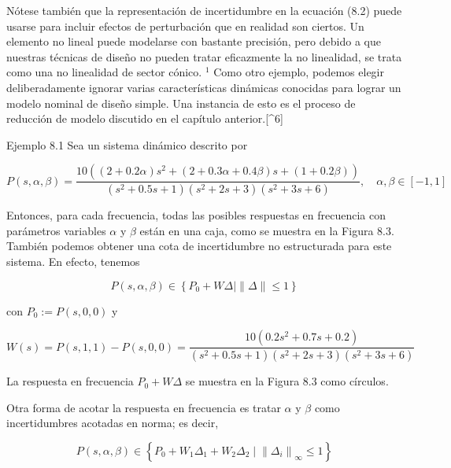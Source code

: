 
Nótese también que la representación de incertidumbre en la ecuación (8.2) puede usarse para incluir efectos de perturbación que en realidad son ciertos. Un elemento no lineal puede modelarse con bastante precisión, pero debido a que nuestras técnicas de diseño no pueden tratar eficazmente la no linealidad, se trata como una no linealidad de sector cónico. ${ }^{1}$ Como otro ejemplo, podemos elegir deliberadamente ignorar varias características dinámicas conocidas para lograr un modelo nominal de diseño simple. Una instancia de esto es el proceso de reducción de modelo discutido en el capítulo anterior.[\^{}6]

Ejemplo 8.1 Sea un sistema dinámico descrito por

$$
P(s, \alpha, \beta)=\frac{10\left((2+0.2 \alpha) s^{2}+(2+0.3 \alpha+0.4 \beta) s+(1+0.2 \beta)\right)}{\left(s^{2}+0.5 s+1\right)\left(s^{2}+2 s+3\right)\left(s^{2}+3 s+6\right)}, \quad \alpha, \beta \in[-1,1]
$$

Entonces, para cada frecuencia, todas las posibles respuestas en frecuencia con parámetros variables $\alpha$ y $\beta$ están en una caja, como se muestra en la Figura 8.3. También podemos obtener una cota de incertidumbre no estructurada para este sistema. En efecto, tenemos

$$
P(s, \alpha, \beta) \in\left\{P_{0}+W \Delta \mid\|\Delta\| \leq 1\right\}
$$

con $P_{0}:=P(s, 0,0)$ y

$$
W(s)=P(s, 1,1)-P(s, 0,0)=\frac{10\left(0.2 s^{2}+0.7 s+0.2\right)}{\left(s^{2}+0.5 s+1\right)\left(s^{2}+2 s+3\right)\left(s^{2}+3 s+6\right)}
$$

La respuesta en frecuencia $P_{0}+W \Delta$ se muestra en la Figura 8.3 como círculos.


Otra forma de acotar la respuesta en frecuencia es tratar $\alpha$ y $\beta$ como incertidumbres acotadas en norma; es decir,

$$
P(s, \alpha, \beta) \in\left\{P_{0}+W_{1} \Delta_{1}+W_{2} \Delta_{2} \mid\left\|\Delta_{i}\right\|_{\infty} \leq 1\right\}
$$

